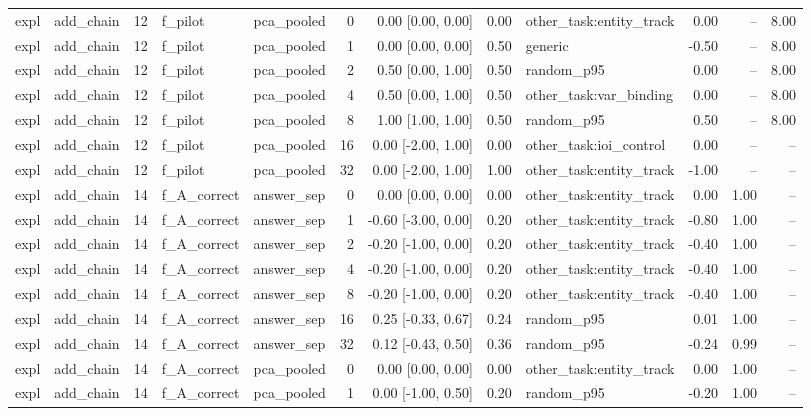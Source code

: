 \begin{tabular}{llrllrrrlrrr}
expl & add\_chain & 12 & f\_pilot & pca\_pooled & 0 & 0.00 [0.00, 0.00] & 0.00 & other\_task:entity\_track & 0.00 & -- & 8.00 \\
expl & add\_chain & 12 & f\_pilot & pca\_pooled & 1 & 0.00 [0.00, 0.00] & 0.50 & generic & -0.50 & -- & 8.00 \\
expl & add\_chain & 12 & f\_pilot & pca\_pooled & 2 & 0.50 [0.00, 1.00] & 0.50 & random\_p95 & 0.00 & -- & 8.00 \\
expl & add\_chain & 12 & f\_pilot & pca\_pooled & 4 & 0.50 [0.00, 1.00] & 0.50 & other\_task:var\_binding & 0.00 & -- & 8.00 \\
expl & add\_chain & 12 & f\_pilot & pca\_pooled & 8 & 1.00 [1.00, 1.00] & 0.50 & random\_p95 & 0.50 & -- & 8.00 \\
expl & add\_chain & 12 & f\_pilot & pca\_pooled & 16 & 0.00 [-2.00, 1.00] & 0.00 & other\_task:ioi\_control & 0.00 & -- & -- \\
expl & add\_chain & 12 & f\_pilot & pca\_pooled & 32 & 0.00 [-2.00, 1.00] & 1.00 & other\_task:entity\_track & -1.00 & -- & -- \\
expl & add\_chain & 14 & f\_A\_correct & answer\_sep & 0 & 0.00 [0.00, 0.00] & 0.00 & other\_task:entity\_track & 0.00 & 1.00 & -- \\
expl & add\_chain & 14 & f\_A\_correct & answer\_sep & 1 & -0.60 [-3.00, 0.00] & 0.20 & other\_task:entity\_track & -0.80 & 1.00 & -- \\
expl & add\_chain & 14 & f\_A\_correct & answer\_sep & 2 & -0.20 [-1.00, 0.00] & 0.20 & other\_task:entity\_track & -0.40 & 1.00 & -- \\
expl & add\_chain & 14 & f\_A\_correct & answer\_sep & 4 & -0.20 [-1.00, 0.00] & 0.20 & other\_task:entity\_track & -0.40 & 1.00 & -- \\
expl & add\_chain & 14 & f\_A\_correct & answer\_sep & 8 & -0.20 [-1.00, 0.00] & 0.20 & other\_task:entity\_track & -0.40 & 1.00 & -- \\
expl & add\_chain & 14 & f\_A\_correct & answer\_sep & 16 & 0.25 [-0.33, 0.67] & 0.24 & random\_p95 & 0.01 & 1.00 & -- \\
expl & add\_chain & 14 & f\_A\_correct & answer\_sep & 32 & 0.12 [-0.43, 0.50] & 0.36 & random\_p95 & -0.24 & 0.99 & -- \\
expl & add\_chain & 14 & f\_A\_correct & pca\_pooled & 0 & 0.00 [0.00, 0.00] & 0.00 & other\_task:entity\_track & 0.00 & 1.00 & -- \\
expl & add\_chain & 14 & f\_A\_correct & pca\_pooled & 1 & 0.00 [-1.00, 0.50] & 0.20 & random\_p95 & -0.20 & 1.00 & -- \\

\end{tabular}
